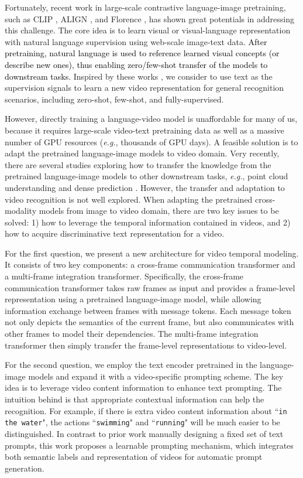 \documentclass[runningheads]{llncs}
\begin{document}
Fortunately, recent work in large-scale contrastive language-image pretraining, such as CLIP \cite{clip}, ALIGN \cite{align}, and Florence \cite{florence}, has shown great potentials in addressing this challenge. The core idea is to learn visual or visual-language representation with natural language supervision using web-scale image-text data. \textcolor{black}{After pretraining, natural language is used to reference learned visual concepts (or describe new ones), thus enabling zero/few-shot transfer of the models to downstream tasks.} Inspired by these works \cite{clip,align,florence}, we consider to use text as the supervision signals to learn a new video representation for general recognition scenarios, including zero-shot, few-shot, and fully-supervised.

However, directly training a language-video model is unaffordable for many of us, because it requires large-scale video-text pretraining data as well as a massive number of GPU resources (\emph{e.g.}, thousands of GPU days). A feasible solution is to adapt the pretrained language-image models to video domain. Very recently, there are several studies exploring how to transfer the knowledge from the pretrained language-image models to other downstream tasks, \emph{e.g.}, point cloud understanding \cite{zhang2021pointclip} and dense prediction \cite{rao2021denseclip,zhou2021denseclip}. However, the transfer and adaptation to video recognition is not well explored. When adapting the pretrained cross-modality models from image to video domain, there are two key issues to be solved: 1) how to leverage the temporal information contained in videos, and 2) how to acquire discriminative text representation for a video.

For the first question, we present a new architecture for video temporal modeling. It consists of two key components: a cross-frame communication transformer and a multi-frame integration transformer. Specifically, the cross-frame communication transformer takes raw frames as input and provides a frame-level representation using a pretrained language-image model, while allowing information exchange between frames with message tokens. Each message token not only depicts the semantics of the current frame, but also communicates with other frames to model their dependencies. The multi-frame integration transformer then simply transfer the frame-level representations to video-level.

For the second question, we employ the text encoder pretrained in the language-image models and expand it with a video-specific prompting scheme. The key idea is to leverage video content information to enhance text prompting. The intuition behind is that appropriate contextual information can help the recognition. For example, if there is extra video content information about ``\texttt{in the water}", the actions ``\texttt{swimming}" and ``\texttt{running}" will be much easier to be distinguished. 
In contrast to prior work manually designing a fixed set of text prompts, this work proposes a learnable prompting mechanism, which integrates both semantic labels and representation of videos for automatic prompt generation.
\end{document}
